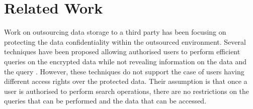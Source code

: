 \documentclass[final,5p,times,twocolumn]{elsarticle}
\begin{document}
\iffalse
Section \ref{sec:conclusions-future-work} Conclusions and Future Work
Section \ref{sec:related-work} Related Work
Section \ref{sec:rbac-overview} Overview of RBAC
Section \ref{sec:approach} The $\mathit{ESPOON_{ERBAC}}$ Approach
Section \ref{sec:solution-details} Solution Details
Section \ref{sec:algorithmic-details} Algorithmic Details
Section \ref{sec:security-analysis} Security Analysis
Section \ref{sec:performance-analysis} Performance Analysis
Section \ref{sec:conclusions-future-work} Conclusions and Future Work
\fi

\section{Related Work}
\label{sec:related-work}

Work on outsourcing data storage to a third party has been focusing on protecting the data confidentiality within the outsourced environment. Several techniques have been proposed allowing authorised users to perform efficient queries on the encrypted data while not revealing information on the data and the query \cite{Song2000, Boneh2004, Golle2004, Curtmola2006, Hwang2007, Boneh2007, Wang2008, Baek2008, Rhee2010, Shao2010, Dong2011}. However, these techniques do not support the case of users having different access rights over the protected data. Their assumption is that once a user is authorised to perform search operations, there are no restrictions on the queries that can be performed and the data that can be accessed.
\end{document}

